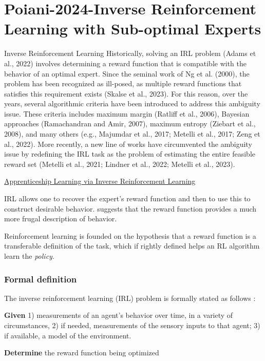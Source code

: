 \documentclass{article}
\begin{document}
\section{Poiani-2024-Inverse Reinforcement Learning with Sub-optimal Experts}

Inverse Reinforcement Learning Historically,
solving an IRL problem (Adams et al., 2022) involves
determining a reward function that is compatible with
the behavior of an optimal expert. Since the seminal
work of Ng et al. (2000), the problem has been recognized
as ill-posed, as multiple reward functions that
satisfies this requirement exists (Skalse et al., 2023).
For this reason, over the years, several algorithmic
criteria have been introduced to address this ambiguity
issue. These criteria includes maximum margin
(Ratliff et al., 2006), Bayesian approaches (Ramachandran
and Amir, 2007), maximum entropy (Ziebart
et al., 2008), and many others (e.g., Majumdar et al.,
2017; Metelli et al., 2017; Zeng et al., 2022). More
recently, a new line of works have circumvented the
ambiguity issue by redefining the IRL task as the problem
of estimating the entire feasible reward set (Metelli
et al., 2021; Lindner et al., 2022; Metelli et al., 2023).

\href{https://ai.stanford.edu/~ang/papers/icml04-apprentice.pdf}{Apprenticeship Learning via Inverse Reinforcement Learning}

IRL allows one to recover the expert's reward function and then to use this to construct desirable behavior. \citet{ng2000algorithms} suggests that the reward function provides a much more frugal description of behavior. 

Reinforcement learning is founded on the hypothesis that a reward function is a transferable definition of the task, which if rightly defined helps an RL algorithm learn the \textit{policy}. 

\subsubsection{Formal definition}
The inverse reinforcement learning (IRL) problem is formally stated as follows \citep{ng2000algorithms}:

\textbf{Given} 1) measurements of an agent's behavior over time, in a variety of circumstances, 2) if needed, measurements of the sensory inputs to that agent; 3) if available, a model of the environment.

\textbf{Determine} the reward function being optimized
\end{document}
